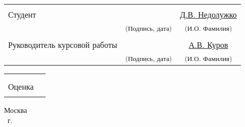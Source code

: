 \begin{titlepage}
    \begin{tabularx}{\textwidth}{Xcc}
      &&\\
      Студент& \uline{\hfill} &  \hfill\uline{Д.В. Недолужко}\\
      &\textsuperscript{\scriptsize{(Подпись, дата)}}&\textsuperscript{\scriptsize{(И.О. Фамилия)}}\\
      &&\\
      Руководитель курсовой работы & \uline{\hfill} & \uline{А.В. Куров}\\
      &\textsuperscript{\scriptsize{(Подпись, дата)}}&\textsuperscript{\scriptsize{(И.О. Фамилия)}}\\
    \end{tabularx}
    
    \begin{tabularx}{\textwidth}{Xc}
      &\\
      Оценка & \rule{6.2cm}{0.15mm}
    \end{tabularx}

    \vfill
    
    \begin{center}
        \normalsize Москва \\
        \the\year ~г.
    \end{center}
\end{titlepage}